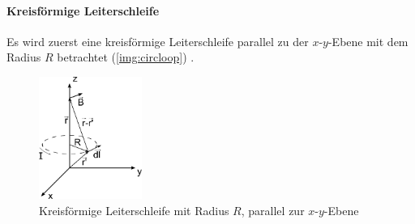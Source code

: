 \paragraph{Kreisförmige Leiterschleife}
Es wird zuerst eine kreisförmige Leiterschleife parallel zu der $x$-$y$-Ebene mit dem Radius $R$ betrachtet (\autoref{img:circloop}) \cite{dem2}.
\begin{figure}[H]
\begin{center}
  \includegraphics[width=0.3\textwidth]{../img/circloop.pdf}
  \caption{Kreisförmige Leiterschleife mit Radius $R$, parallel zur $x$-$y$-Ebene}
  \label{img:circloop}
\end{center}
\end{figure}

